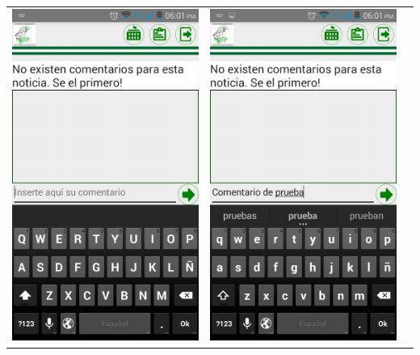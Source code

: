 \begin{tabular}{p{7cm}p{8mm}p{7cm}}

\includegraphics[width=6.5cm]{./android/imagenes/com1.png}

&

\includegraphics[width=6.5cm]{./android/imagenes/com2.png}


\end{tabular}
